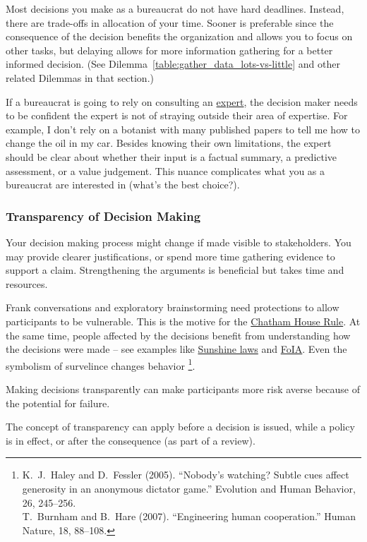 Most decisions you make as a bureaucrat do not have hard deadlines. Instead, there are trade-offs in allocation of your time. Sooner is preferable since the consequence of the decision benefits the organization and allows you to focus on other tasks, but delaying allows for more information gathering for a better informed decision. (See Dilemma~\ref{table:gather_data_lots-vs-little} and other related Dilemmas in that section.)


If a bureaucrat is going to rely on consulting an
\hyperref[sec:expertise]{expert},
the decision maker needs to be confident the expert is not of straying outside their area of expertise. For example, I don't rely on a botanist with many published papers to tell me how to change the oil in my car. 
Besides knowing their own limitations, the expert should be clear about whether their input is a factual summary, a predictive assessment, or a value judgement. This nuance complicates what you as a bureaucrat are interested in (what's the best choice?).


\subsubsection{Transparency of Decision Making\label{sec:transparency-of-decisions}}

Your decision making process might change if made visible to stakeholders. You may provide clearer justifications, or spend more time gathering evidence to support a claim. Strengthening the arguments is beneficial but takes time and resources. 

Frank conversations and exploratory brainstorming need protections to allow participants to be vulnerable. This is the motive for the \href{https://en.wikipedia.org/wiki/Chatham_House_Rule}{Chatham House Rule}. At the same time, people affected by the decisions benefit from understanding how the decisions were made -- see examples like 
\href{https://en.wikipedia.org/wiki/Government_in_the_Sunshine_Act}{Sunshine laws} and \href{https://en.wikipedia.org/wiki/Freedom_of_Information_Act_(United_States)}{FoIA}. Even the symbolism of survelince changes behavior
\footnote{K.~J.~Haley and D.~Fessler (2005). ``Nobody’s watching? Subtle cues affect generosity in an anonymous dictator game.'' Evolution and Human Behavior, 26, 245–256.\\
T.~Burnham and B.~Hare (2007). ``Engineering human cooperation.'' Human Nature, 18, 88–108.}.

Making decisions transparently can make participants more risk averse because of the potential for failure. 

The concept of transparency can apply before a decision is issued, while a policy is in effect, or after the consequence (as part of a review). 